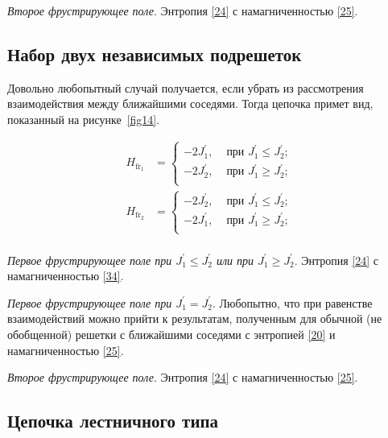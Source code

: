 \emph{Второе фрустрирующее поле}. Энтропия \eqref{24} с намагниченностью \eqref{25}.

\subsection{Набор двух независимых подрешеток}

Довольно любопытный случай получается, если убрать из рассмотрения взаимодействия между ближайшими соседями. Тогда цепочка примет вид, показанный на рисунке~\ref{fig14}.


\[
\begin{aligned}
H_{\text{fr}_1}&=
\begin{cases}
-2J_{1}^{'}, & \text{ при } J_{1}^{'}\leq J_{2}^{'}; \\
-2J_{2}^{'}, & \text{ при } J_{1}^{'}\ge J_{2}^{'}; \\
\end{cases}\\
H_{\text{fr}_2}&=
\begin{cases}
-2J_{2}^{'}, & \text{ при } J_{1}^{'}\leq J_{2}^{'}; \\
-2J_{1}^{'}, & \text{ при } J_{1}^{'}\ge J_{2}^{'}; \\
\end{cases}\\
\end{aligned}
\]

\emph{Первое фрустрирующее поле при $J_{1}^{'}\leq J_{2}^{'}$ или при $J_{1}^{'}\ge J_{2}^{'}$}. Энтропия \eqref{24} с намагниченностью \eqref{34}.

\emph{Первое фрустрирующее поле при $J_{1}^{'} = J_{2}^{'}$}.
Любопытно, что при равенстве взаимодействий можно прийти к результатам, полученным для обычной (не обобщенной) решетки с ближайшими соседями с энтропией \eqref{20} и намагниченностью \eqref{25}.

\emph{Второе фрустрирующее поле}. Энтропия \eqref{24} с намагниченностью \eqref{25}.

\subsection{Цепочка лестничного типа}

